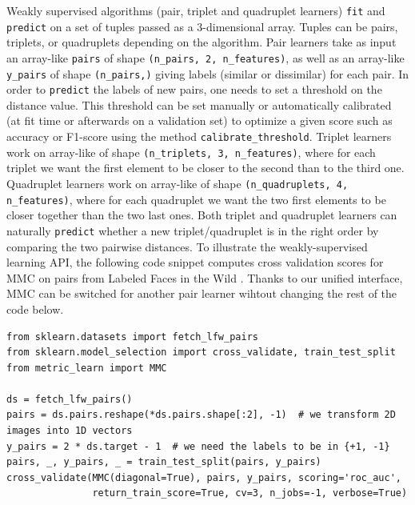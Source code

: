 \documentclass[twoside,11pt]{article}
\newcommand{\william}[1]{\todo[inline,caption={},color=blue!40]{{\it William:~}#1}}
\begin{document}
Weakly supervised algorithms (pair, triplet and quadruplet learners) \texttt{fit} and \texttt{predict} on a set of tuples passed as a 3-dimensional array. Tuples can be pairs, triplets, or quadruplets depending on the algorithm.
Pair learners take as input an array-like \texttt{pairs} of shape \texttt{(n\_pairs, 2, n\_features)}, as well as an array-like \texttt{y\_pairs} of shape \texttt{(n\_pairs,)} giving labels (similar or dissimilar) for each pair.
In order to \texttt{predict} the labels of new pairs, one needs to set a threshold on the distance value.
This threshold can be set manually or automatically calibrated (at fit time or afterwards on a validation set) to optimize a given score such as accuracy or F1-score using the method \texttt{calibrate\_threshold}.
Triplet learners work on array-like of shape \texttt{(n\_triplets, 3, n\_features)}, where for each triplet we want the first element to be closer to the second than to the third one.
Quadruplet learners work on array-like of shape \texttt{(n\_quadruplets, 4, n\_features)}, where for each quadruplet we want the two first elements to be closer together than the two last ones. Both triplet and quadruplet learners can naturally \texttt{predict} whether a new triplet/quadruplet is in the right order by comparing the two pairwise distances.
To illustrate the weakly-supervised learning API, the following code snippet computes cross validation scores for MMC on pairs from Labeled Faces in the Wild \citep{Huang12}. Thanks to our unified interface, MMC can be switched for another pair learner wihtout changing the rest of the code below.
\begin{verbatim}
from sklearn.datasets import fetch_lfw_pairs 
from sklearn.model_selection import cross_validate, train_test_split 
from metric_learn import MMC

ds = fetch_lfw_pairs()
pairs = ds.pairs.reshape(*ds.pairs.shape[:2], -1)  # we transform 2D images into 1D vectors
y_pairs = 2 * ds.target - 1  # we need the labels to be in {+1, -1}
pairs, _, y_pairs, _ = train_test_split(pairs, y_pairs)
cross_validate(MMC(diagonal=True), pairs, y_pairs, scoring='roc_auc', 
               return_train_score=True, cv=3, n_jobs=-1, verbose=True) 
\end{verbatim}
\end{document}
